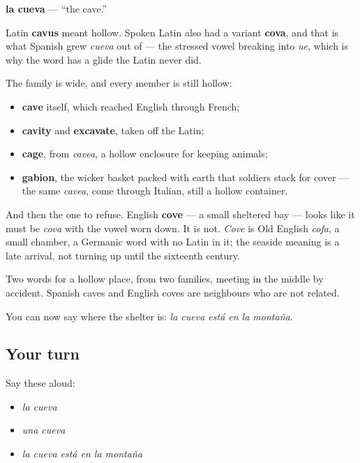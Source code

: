 \begin{cousinweb}
\textbf{la cueva} — \textquotedblleft{}the cave.\textquotedblright{}

Latin \textbf{cavus} meant hollow. Spoken Latin also had a variant \textbf{cova}, and that is what Spanish grew \emph{cueva} out of — the stressed vowel breaking into \emph{ue}, which is why the word has a glide the Latin never did.

The family is wide, and every member is still hollow:

\begin{itemize}
\raggedright
  \item \textbf{cave} itself, which reached English through French;
  \item \textbf{cavity} and \textbf{excavate}, taken off the Latin;
  \item \textbf{cage}, from \emph{cavea}, a hollow enclosure for keeping animals;
  \item \textbf{gabion}, the wicker basket packed with earth that soldiers stack for cover — the same \emph{cavea}, come through Italian, still a hollow container.
\end{itemize}

And then the one to refuse. English \textbf{cove} — a small sheltered bay — looks like it must be \emph{cova} with the vowel worn down. It is not. \emph{Cove} is Old English \emph{cofa}, a small chamber, a Germanic word with no Latin in it; the seaside meaning is a late arrival, not turning up until the sixteenth century.

Two words for a hollow place, from two families, meeting in the middle by accident. Spanish caves and English coves are neighbours who are not related.
\end{cousinweb}

\begin{grammarlens}[title={What you've built}]
You can now say where the shelter is: \emph{la cueva está en la montaña}.
\end{grammarlens}

\subsection*{Your turn}
Say these aloud:

\begin{itemize}
\raggedright
  \item \emph{la cueva}
  \item \emph{una cueva}
  \item \emph{la cueva está en la montaña}
\end{itemize}

